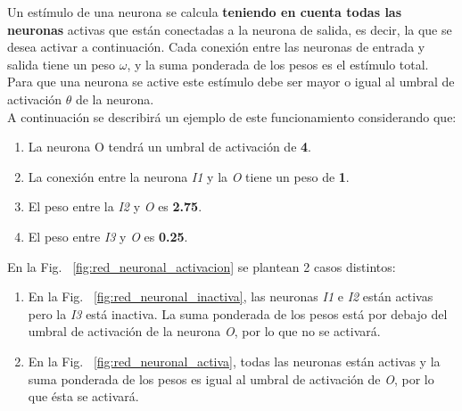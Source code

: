 Un estímulo de una neurona se calcula \textbf{teniendo en cuenta todas las neuronas} activas que están conectadas a la neurona de salida, es decir, la que se desea activar a continuación. Cada conexión entre las neuronas de entrada y salida tiene un peso $\omega$, y la suma ponderada de los pesos es el estímulo total. Para que una neurona se active este estímulo debe ser mayor o igual al umbral de activación $\theta$ de la neurona. \\

A continuación se describirá un ejemplo de este funcionamiento considerando que:

\begin{enumerate}
    \item La neurona O tendrá un umbral de activación de \textbf{4}.
    \item La conexión entre la neurona \textit{I1} y la \textit{O} tiene un peso de \textbf{1}.
    \item El peso entre la \textit{I2} y \textit{O} es \textbf{2.75}.
    \item El peso entre \textit{I3} y \textit{O} es \textbf{0.25}.
\end{enumerate} 

En la Fig. ~\ref{fig:red_neuronal_activacion} se plantean 2 casos distintos: 

\begin{enumerate}
    \item En la Fig. ~\ref{fig:red_neuronal_inactiva}, las neuronas \textit{I1} e \textit{I2} están activas pero la \textit{I3} está inactiva. La suma ponderada de los pesos está por debajo del umbral de activación de la neurona \textit{O}, por lo que no se activará. 
    \item En la Fig. ~\ref{fig:red_neuronal_activa}, todas las neuronas están activas y la suma ponderada de los pesos es igual al umbral de activación de \textit{O}, por lo que ésta se activará.
\end{enumerate}

